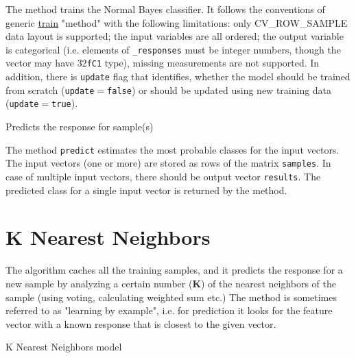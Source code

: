 The method trains the Normal Bayes classifier. It follows the conventions of generic \href{#CvStatModel\_train}{train} "method" with the following limitations: only CV\_ROW\_SAMPLE data layout is supported; the input variables are all ordered; the output variable is categorical (i.e. elements of \texttt{\_responses} must be integer numbers, though the vector may have \texttt{$32$fC1} type), missing measurements are not supported.
\newline
\newline
In addition, there is \texttt{update} flag that identifies, whether the model should be trained from scratch (\texttt{update$=$false}) or should be updated using new training data (\texttt{update$=$true}).


Predicts the response for sample(s)


The method \texttt{predict} estimates the most probable classes for the input vectors. The input vectors (one or more) are stored as rows of the matrix \texttt{samples}. In case of multiple input vectors, there should be output vector \texttt{results}. The predicted class for a single input vector is returned by the method.

\section{K Nearest Neighbors}


The algorithm caches all the training samples, and it predicts the response for a new sample by analyzing a certain number (\textbf{K}) of the nearest neighbors of the sample (using voting, calculating weighted sum etc.) The method is sometimes referred to as "learning by example", i.e. for prediction it looks for the feature vector with a known response that is closest to the given vector.



K Nearest Neighbors model

